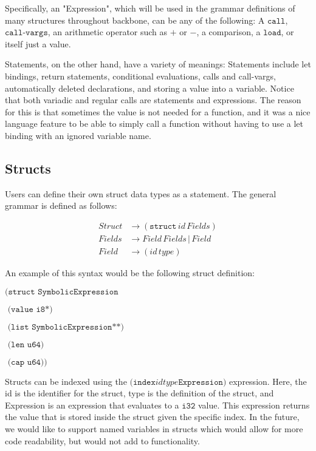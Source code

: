\documentclass[journal=jacsat, manuscript=article]{achemso}
\begin{document}
Specifically, an "Expression", which will be used in the grammar definitions of
many structures throughout backbone, can be any of the following: A $\texttt{call}$, $\texttt{call-vargs}$, an arithmetic operator such as $+$ or $-$,
a comparison, a $\texttt{load}$, or itself just a value.

Statements, on the other hand, have a variety of meanings: Statements include let bindings,
return statements, conditional evaluations, calls and call-vargs, automatically deleted
declarations, and storing a value into a variable. Notice that both variadic and regular
calls are statements and expressions. The reason for this is that sometimes the value is not
needed for a function, and it was a nice language feature to be able to simply call a function
without having to use a let binding with an ignored variable name.

\subsection{Structs}

Users can define their own struct data types as a statement. The general
grammar is defined as follows:

\begin{align}
Struct &\rightarrow (\texttt{struct}\,id\,Fields) \\
Fields &\rightarrow Field\,Fields\,|\,Field \\
Field  &\rightarrow (id\,type)
\end{align}

An example of this syntax would be the following struct definition:

$\texttt{(struct SymbolicExpression}$

$\texttt{  (value i8*)}$

$\texttt{  (list SymbolicExpression**)}$

$\texttt{  (len u64)}$

$\texttt{  (cap u64))}$

Structs can be indexed using the $\texttt{(index} id type \texttt{Expression)}$ expression. Here, the
id is the identifier for the struct, type is the definition of the struct, and Expression is an expression
that evaluates to a $\texttt{i32}$ value. This expression returns the value that is stored inside the
struct given the specific index. In the future, we would like to support named variables in structs which
would allow for more code readability, but would not add to functionality.
\end{document}
